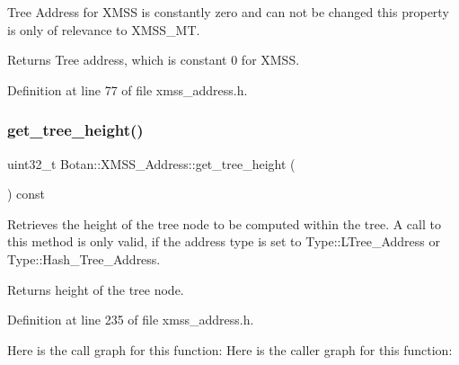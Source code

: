 Tree Address for X\+M\+SS is constantly zero and can not be changed this property is only of relevance to X\+M\+S\+S\+\_\+\+MT.

\begin{DoxyReturn}{Returns}
Tree address, which is constant 0 for X\+M\+SS. 
\end{DoxyReturn}


Definition at line 77 of file xmss\+\_\+address.\+h.

\mbox{\label{class_botan_1_1_x_m_s_s___address_a7e619c5b15ba74f596eb3d5b6035a0f1}} 
\subsubsection{\texorpdfstring{get\+\_\+tree\+\_\+height()}{get\_tree\_height()}}
{\footnotesize\ttfamily uint32\+\_\+t Botan\+::\+X\+M\+S\+S\+\_\+\+Address\+::get\+\_\+tree\+\_\+height (\begin{DoxyParamCaption}{ }\end{DoxyParamCaption}) const\hspace{0.3cm}{\ttfamily [inline]}}

Retrieves the height of the tree node to be computed within the tree. A call to this method is only valid, if the address type is set to Type\+::\+L\+Tree\+\_\+\+Address or Type\+::\+Hash\+\_\+\+Tree\+\_\+\+Address.

\begin{DoxyReturn}{Returns}
height of the tree node. 
\end{DoxyReturn}


Definition at line 235 of file xmss\+\_\+address.\+h.

Here is the call graph for this function\+:
Here is the caller graph for this function\+:
\mbox{\label{class_botan_1_1_x_m_s_s___address_a40990bf9e24b0f2967d18ed6af4197a9}} 
